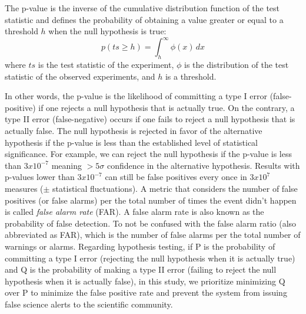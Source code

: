 \begin{definition}
\label{def:pvalues} 
The p-value is the inverse of the cumulative distribution function of the test statistic and defines the probability of obtaining a value greater or equal to a threshold $h$ when the null hypothesis is true:
$$ p(ts \geq h) = \int_{h}^{\infty} \phi(x) \,dx $$
where $ts$ is the test statistic of the experiment, $\phi$ is the distribution of the test statistic of the observed experiments, and $h$ is a threshold.
\end{definition}
In other words, the p-value is the likelihood of committing a type I error (false-positive) if one rejects a null hypothesis that is actually true. On the contrary, a type II error (false-negative) occurs if one fails to reject a null hypothesis that is actually false.
The null hypothesis is rejected in favor of the alternative hypothesis if the p-value is less than the established level of statistical significance. 
For example, we can reject the null hypothesis if the p-value is less than $3x10^{-7}$ meaning $> 5\sigma$ confidence in the alternative hypothesis. 
Results with p-values lower than $3x10^{-7}$ can still be false positives every once in $3x10^7$ measures ($\pm$ statistical fluctuations). A metric that considers the number of false positives (or false alarms) per the total number of times the event didn't happen is called \textit{false alarm rate} (FAR). A false alarm rate is also known as the probability of false detection. To not be confused with the false alarm ratio (also abbreviated as FAR), which is the number of false alarms per the total number of warnings or alarms. Regarding hypothesis testing, if P is the probability of committing a type I error (rejecting the null hypothesis when it is actually true) and Q is the probability of making a type II error (failing to reject the null hypothesis when it is actually false), in this study, we prioritize minimizing Q over P to minimize the false positive rate and prevent the system from issuing false science alerts to the scientific community. 

